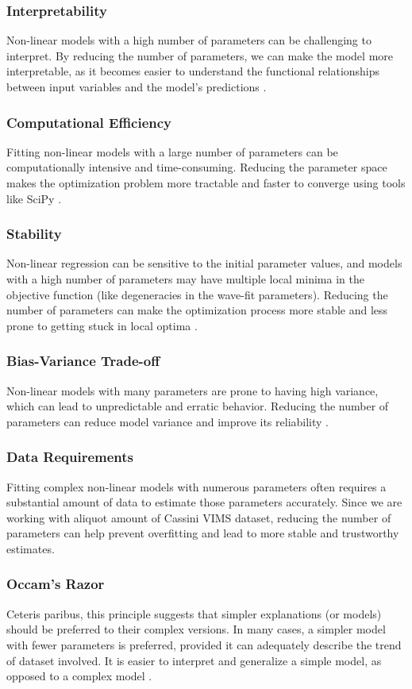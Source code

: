 \documentclass[conference]{IEEEtran}
\begin{document}
\subsubsection{Interpretability} 
Non-linear models with a high number of parameters can be challenging to interpret. By reducing the number of parameters, we can make the model more interpretable, as it becomes easier to understand the functional relationships between input variables and the model's predictions \cite{molnar2020interpretable}.
\subsubsection{Computational Efficiency} 
Fitting non-linear models with a large number of parameters can be computationally intensive and time-consuming. Reducing the parameter space makes the optimization problem more tractable and faster to converge using tools like SciPy \cite{nocedal2006numerical}.
\subsubsection{Stability} 
Non-linear regression can be sensitive to the initial parameter values, and models with a high number of parameters may have multiple local minima in the objective function (like degeneracies in the wave-fit parameters). Reducing the number of parameters can make the optimization process more stable and less prone to getting stuck in local optima \cite{nocedal2006numerical}.
\subsubsection{Bias-Variance Trade-off} 
Non-linear models with many parameters are prone to having high variance, which can lead to unpredictable and erratic behavior. Reducing the number of parameters can reduce model variance and improve its reliability \cite{hastie2009elements}.
\subsubsection{Data Requirements} 
Fitting complex non-linear models with numerous parameters often requires a substantial amount of data to estimate those parameters accurately. Since we are working with aliquot amount of Cassini VIMS dataset, reducing the number of parameters can help prevent overfitting and lead to more stable and trustworthy estimates.
\subsubsection{Occam's Razor} 
Ceteris paribus, this principle suggests that simpler explanations (or models) should be preferred to their complex versions. In many cases, a simpler model with fewer parameters is preferred, provided it can adequately describe the trend of dataset involved. It is easier to interpret and generalize a simple model, as opposed to a complex model \cite{Sober2015-SOBORA}.
\end{document}
